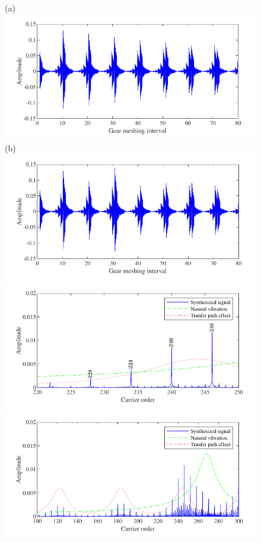 \documentclass[a4paper,fleqn]{cas-sc}%
\begin{document}
\begin{figure}[pos=htbp]
    \centering
    (a) \includegraphics[scale=\myscale,valign=t]{Time_p6_normal.pdf}
    (b) \includegraphics[scale=\myscale,valign=t]{Time_p6_slight_error.pdf}\\
    \hspace*{1.5em}\includegraphics[scale=\myscale,valign=t]{Freq_p6_normal.pdf}
    \hspace*{1.5em}\includegraphics[scale=\myscale,valign=t]{Freq_p6_slight_error.pdf}\\

\end{figure}
\end{document}
